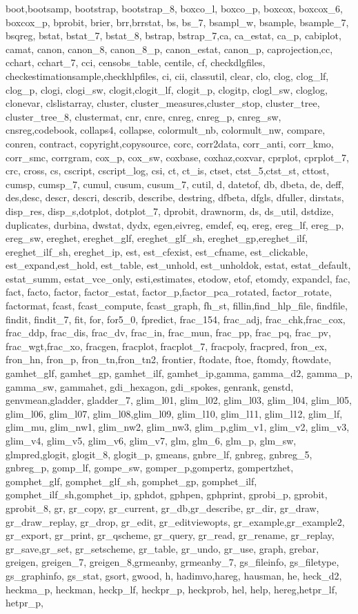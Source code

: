 {{boot,bootsamp, bootstrap, bootstrap_8, boxco_l, boxco_p, boxcox, boxcox_6, boxcox_p, bprobit, brier, brr,brrstat, bs, bs_7, bsampl_w, bsample, bsample_7, bsqreg, bstat, bstat_7, bstat_8, bstrap, bstrap_7,ca, ca_estat, ca_p, cabiplot, camat, canon, canon_8, canon_8_p, canon_estat, canon_p, caprojection,cc, cchart, cchart_7, cci, censobs_table, centile, cf, checkdlgfiles, checkestimationsample,checkhlpfiles, ci, cii, classutil, clear, clo, clog, clog_lf, clog_p, clogi, clogi_sw, clogit,clogit_lf, clogit_p, clogitp, clogl_sw, cloglog, clonevar, clslistarray, cluster, cluster_measures,cluster_stop, cluster_tree, cluster_tree_8, clustermat, cnr, cnre, cnreg, cnreg_p, cnreg_sw, cnsreg,codebook, collaps4, collapse, colormult_nb, colormult_nw, compare, conren, contract, copyright,copysource, corc, corr2data, corr_anti, corr_kmo, corr_smc, corrgram, cox_p, cox_sw, coxbase, coxhaz,coxvar, cprplot, cprplot_7, crc, cross, cs, cscript, cscript_log, csi, ct, ct_is, ctset, ctst_5,ctst_st, cttost, cumsp, cumsp_7, cumul, cusum, cusum_7, cutil, d, datetof, db, dbeta, de, deff, des,desc, descr, descri, describ, describe, destring, dfbeta, dfgls, dfuller, dirstats, disp_res, disp_s,dotplot, dotplot_7, dprobit, drawnorm, ds, ds_util, dstdize, duplicates, durbina, dwstat, dydx, egen,eivreg, emdef, eq, ereg, ereg_lf, ereg_p, ereg_sw, ereghet, ereghet_glf, ereghet_glf_sh, ereghet_gp,ereghet_ilf, ereghet_ilf_sh, ereghet_ip, est, est_cfexist, est_cfname, est_clickable, est_expand,est_hold, est_table, est_unhold, est_unholdok, estat, estat_default, estat_summ, estat_vce_only, esti,estimates, etodow, etof, etomdy, expandcl, fac, fact, facto, factor, factor_estat, factor_p,factor_pca_rotated, factor_rotate, factormat, fcast, fcast_compute, fcast_graph, fh_st, fillin,find_hlp_file, findfile, findit, findit_7, fit, for, for5_0, fpredict, frac_154, frac_adj, frac_chk,frac_cox, frac_ddp, frac_dis, frac_dv, frac_in, frac_mun, frac_pp, frac_pq, frac_pv, frac_wgt,frac_xo, fracgen, fracplot, fracplot_7, fracpoly, fracpred, fron_ex, fron_hn, fron_p, fron_tn,fron_tn2, frontier, ftodate, ftoe, ftomdy, ftowdate, gamhet_glf, gamhet_gp, gamhet_ilf, gamhet_ip,gamma, gamma_d2, gamma_p, gamma_sw, gammahet, gdi_hexagon, gdi_spokes, genrank, genstd, genvmean,gladder, gladder_7, glim_l01, glim_l02, glim_l03, glim_l04, glim_l05, glim_l06, glim_l07, glim_l08,glim_l09, glim_l10, glim_l11, glim_l12, glim_lf, glim_mu, glim_nw1, glim_nw2, glim_nw3, glim_p,glim_v1, glim_v2, glim_v3, glim_v4, glim_v5, glim_v6, glim_v7, glm, glm_6, glm_p, glm_sw, glmpred,glogit, glogit_8, glogit_p, gmeans, gnbre_lf, gnbreg, gnbreg_5, gnbreg_p, gomp_lf, gompe_sw, gomper_p,gompertz, gompertzhet, gomphet_glf, gomphet_glf_sh, gomphet_gp, gomphet_ilf, gomphet_ilf_sh,gomphet_ip, gphdot, gphpen, gphprint, gprobi_p, gprobit, gprobit_8, gr, gr_copy, gr_current, gr_db,gr_describe, gr_dir, gr_draw, gr_draw_replay, gr_drop, gr_edit, gr_editviewopts, gr_example,gr_example2, gr_export, gr_print, gr_qscheme, gr_query, gr_read, gr_rename, gr_replay, gr_save,gr_set, gr_setscheme, gr_table, gr_undo, gr_use, graph, grebar, greigen, greigen_7, greigen_8,grmeanby, grmeanby_7, gs_fileinfo, gs_filetype, gs_graphinfo, gs_stat, gsort, gwood, h, hadimvo,hareg, hausman, he, heck_d2, heckma_p, heckman, heckp_lf, heckpr_p, heckprob, hel, help, hereg,hetpr_lf, hetpr_p, }}

